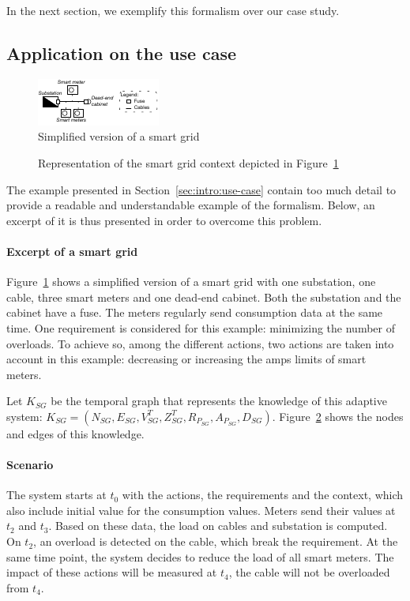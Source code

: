 In the next section, we exemplify this formalism over our case study.


\subsection{Application on the use case}
\begin{figure}
	\centering
	\includegraphics[width=0.5\linewidth]{img/chapt-tkm/excerptSG}
	\caption{Simplified version of a smart grid}
	\label{fig:tkm:excerptSG}
\end{figure}

\begin{figure}
	\caption{Representation of the smart grid context depicted in Figure~\ref{fig:tkm:excerptSG}}
	\label{fig:tkm:contextFormExample}
\end{figure}


The example presented in Section~\ref{sec:intro:use-case} contain too much detail to provide a readable and understandable example of the formalism.
Below, an excerpt of it is thus presented in order to overcome this problem.


\paragraph{Excerpt of a smart grid}
Figure~\ref{fig:tkm:excerptSG} shows a simplified version of a smart grid with one substation, one cable, three smart meters and one dead-end cabinet.
Both the substation and the cabinet have a fuse.
The meters regularly send consumption data at the same time.
One requirement is considered for this example: minimizing the number of overloads.
To achieve so, among the different actions, two actions are taken into account in this example: decreasing or increasing the amps limits of smart meters.

Let $K_{SG}$ be the temporal graph that represents the knowledge of this adaptive system: $K_{SG} = (N_{SG}, E_{SG}, V^T_{SG}, Z^T_{SG}, R_{P_{SG}}, A_{P_{SG}}, D_{SG})$.
Figure~\ref{fig:tkm:contextFormExample} shows the nodes and edges of this knowledge.

\paragraph{Scenario}
The system starts at $t_0$ with the actions, the requirements and the context, which also include initial value for the consumption values.
Meters send their values at $t_2$ and $t_3$.
Based on these data, the load on cables and substation is computed.
On $t_2$, an overload is detected on the cable, which break the requirement.
At the same time point, the system decides to reduce the load of all smart meters.
The impact of these actions will be measured at $t_4$, \ie the cable will not be overloaded from $t_4$.

